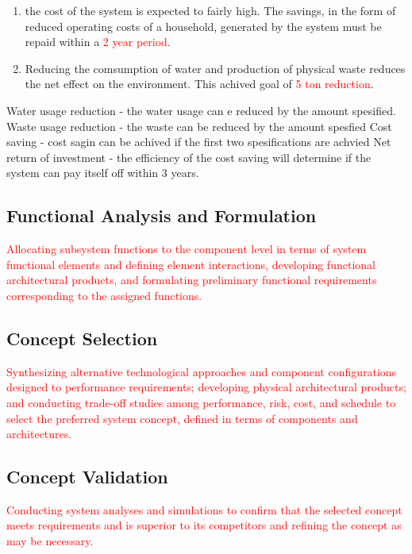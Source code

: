 \documentclass[a4paper,11pt,fleqn]{report}
\begin{document}
\begin{enumerate}
\begin{enumerate}
        \item the cost of the system is expected to fairly high. The savings, in the form of reduced operating costs of a household, generated by the system must be repaid within a \textcolor{red}{2 year period}.
        \item Reducing the comsumption of water and production of physical waste reduces the net effect on the environment. This achived goal of \textcolor{red}{5 ton reduction}.
    \end{enumerate}
\end{enumerate}



Water usage reduction - the water usage can e reduced by the amount spesified.
Waste usage reduction - the waste can be reduced by the amount spesfied
Cost saving - cost sagin can be achived if the first two spesifications are achvied
Net return of investment - the efficiency of the cost saving will determine if the system can pay itself off within 3 years. 




\subsection{Functional Analysis and Formulation} 
\textcolor{red}{Allocating subsystem functions to the component level in terms of system functional elements and defining element interactions, developing functional architectural products, and formulating preliminary functional requirements corresponding to the assigned functions.}

\subsection{Concept Selection}
\textcolor{red}{Synthesizing alternative technological approaches and component configurations designed to performance requirements; developing physical architectural products; and conducting trade-off studies among performance, risk, cost, and schedule to select the preferred system concept, defined in terms of components and architectures.}

\subsection{Concept Validation}
\textcolor{red}{Conducting system analyses and simulations to confirm that the selected concept meets requirements and is superior to its competitors and refining the concept as may be necessary.}
\end{document}
